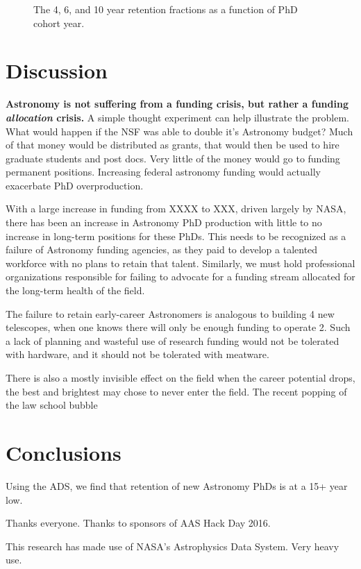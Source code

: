 \documentclass{emulateapj}
\begin{document}
\begin{figure}
  \caption{The 4, 6, and 10 year retention fractions as a function of PhD cohort year.\label{fig:retention}}
\end{figure}


\section{Discussion}

{\bf{Astronomy is not suffering from a funding crisis, but rather a funding {\emph{allocation}} crisis.}} A simple thought experiment can help illustrate the problem. What would happen if the NSF was able to double it's Astronomy budget? Much of that money would be distributed as grants, that would then be used to hire graduate students and post docs. Very little of the money would go to funding permanent positions. Increasing federal astronomy funding would actually exacerbate PhD overproduction. 

With a large increase in funding from XXXX to XXX, driven largely by NASA, there has been an increase in Astronomy PhD production with little to no increase in long-term positions for these PhDs.  This needs to be recognized as a failure of Astronomy funding agencies, as they paid to develop a talented workforce with no plans to retain that talent. Similarly, we must hold professional organizations responsible for failing to advocate for a funding stream allocated for the long-term health of the field.  

The failure to retain early-career Astronomers is analogous to building 4 new telescopes, when one knows there will only be enough funding to operate 2.  Such a lack of planning and wasteful use of research funding would not be tolerated with hardware, and it should not be tolerated with meatware. 

There is also a mostly invisible effect on the field when the career potential drops, the best and brightest may chose to never enter the field.  The recent popping of the law school bubble %



\section{Conclusions}
Using the ADS, we find that retention of new Astronomy PhDs is at a 15+ year low.  


\acknowledgments
Thanks everyone. Thanks to sponsors of AAS Hack Day 2016.

This research has made use of NASA's Astrophysics Data System. Very heavy use.


\end{document}
